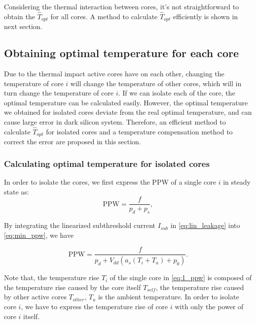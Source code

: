 Considering the thermal interaction between cores, it's not straightforward to obtain the $\hat{T}_{opt}$ for all cores. A method to calculate $\hat{T}_{opt}$ efficiently is shown in next section.

\subsection{Obtaining optimal temperature for each core}
Due to the thermal impact active cores have on each other, changing the temperature of core $i$ will change the temperature of other cores, which will in turn change the temperature of core $i$. If we can isolate each of the core, the optimal temperature can be calculated easily. However, the optimal temperature we obtained for isolated cores deviate from the real optimal temperature, and can cause large error in dark silicon system. Therefore, an efficient method to calculate $\hat{T}_{opt}$ for isolated cores and a temperature compensation method to correct the error are proposed in this section.

\subsubsection{Calculating optimal temperature for isolated cores}
In order to isolate the cores, we first express the PPW of a single core $i$ in steady state as:
\begin{equation}\label{eq:min_ppw}
\text{PPW}=\frac{f}{p_{d}+p_{s}},
\end{equation}

By integrating the linearized subthreshold current $I_{sub}$ in \eqref{eq:lin_leakage} into \eqref{eq:min_ppw}, we have

\begin{equation}\label{eq:1_ppw}
\text{PPW} = \frac{f}{p_{d}+V_{dd}(a_{s}(T_{i}+T_{a})+p_{0})}.
\end{equation}

Note that, the temperature rise $T_{i}$ of the single core in \eqref{eq:1_ppw} is composed of the temperature rise caused by the core itself $T_{self}$, the temperature rise caused by other active cores $T_{other}$, $T_{a}$ is the ambient temperature. In order to isolate core $i$, we have to express the temperature rise of core $i$ with only the power of core $i$ itself.

